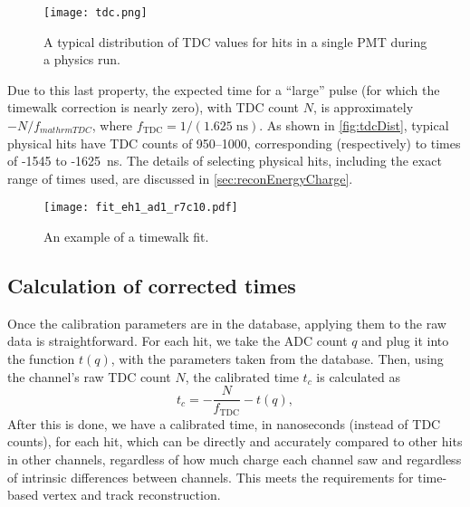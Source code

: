 \documentclass[../thesis.tex]{subfiles}
\begin{document}
\begin{figure}[ht]
  \texttt{[image: tdc.png]}
  \caption{A typical distribution of TDC values for hits in a single PMT during a physics run.}
  \label{fig:tdcDist}
\end{figure}

Due to this last property, the expected time for a ``large'' pulse (for which the timewalk correction is nearly zero), with TDC count $N$, is approximately $-N/f_{mathrm{TDC}}$, where $f_{\mathrm{TDC}} = 1/(1.625\;\text{ns})$. As shown in \autoref{fig:tdcDist}, typical physical hits have TDC counts of 950--1000, corresponding (respectively) to times of -1545 to -1625~ns. The details of selecting physical hits, including the exact range of times used, are discussed in \autoref{sec:reconEnergyCharge}.


\begin{figure}
  \texttt{[image: fit\_eh1\_ad1\_r7c10.pdf]}
  \caption{An example of a timewalk fit.}
  \label{fig:timewalk}
\end{figure}

\begin{comment}
  Show the tof-corrected times; comment on TDC discretization.
\end{comment}

\subsection{Calculation of corrected times}

Once the calibration parameters are in the database, applying them to the raw data is straightforward. For each hit, we take the ADC count $q$ and plug it into the function $t(q)$, with the parameters taken from the database. Then, using the channel's raw TDC count $N$, the calibrated time $t_c$ is calculated as
\begin{equation}
  \label{eq:corrTime}
  t_c = -\frac{N}{f_\mathrm{TDC}} - t(q),
\end{equation}
After this is done, we have a calibrated time, in nanoseconds (instead of TDC counts), for each hit, which can be directly and accurately compared to other hits in other channels, regardless of how much charge each channel saw and regardless of intrinsic differences between channels. This meets the requirements for time-based vertex and track reconstruction.
\end{document}
